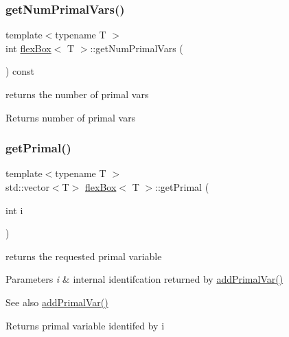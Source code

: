\subsubsection{\texorpdfstring{get\+Num\+Primal\+Vars()}{getNumPrimalVars()}}
{\footnotesize\ttfamily template$<$typename T $>$ \\
int \hyperlink{classflex_box}{flex\+Box}$<$ T $>$\+::get\+Num\+Primal\+Vars (\begin{DoxyParamCaption}{ }\end{DoxyParamCaption}) const\hspace{0.3cm}{\ttfamily [inline]}}



returns the number of primal vars 

\begin{DoxyReturn}{Returns}
number of primal vars 
\end{DoxyReturn}
\mbox{\label{classflex_box_ae1c5100eec86603d23d5116ba8d93e9d}} 
\subsubsection{\texorpdfstring{get\+Primal()}{getPrimal()}}
{\footnotesize\ttfamily template$<$typename T $>$ \\
std\+::vector$<$T$>$ \hyperlink{classflex_box}{flex\+Box}$<$ T $>$\+::get\+Primal (\begin{DoxyParamCaption}\item[{int}]{i }\end{DoxyParamCaption})\hspace{0.3cm}{\ttfamily [inline]}}



returns the requested primal variable 


\begin{DoxyParams}{Parameters}
{\em i} & internal identifcation returned by \hyperlink{classflex_box_a659aac107b85ecf64c9fd1aaa465a98d}{add\+Primal\+Var()} \\
\hline
\end{DoxyParams}
\begin{DoxySeeAlso}{See also}
\hyperlink{classflex_box_a659aac107b85ecf64c9fd1aaa465a98d}{add\+Primal\+Var()} 
\end{DoxySeeAlso}
\begin{DoxyReturn}{Returns}
primal variable identifed by i 
\end{DoxyReturn}
\mbox{\label{classflex_box_a77e4f589d87b7c34170778c9abbea3b3}} 
